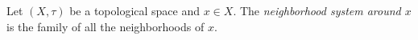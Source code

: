 \documentclass[12pt]{article}
\begin{document}
Let $(X,\tau)$ be a topological space and $x\in X$. The \emph{neighborhood system around $x$} is the family of all the neighborhoods of $x$.
\end{document}
